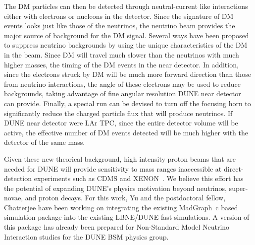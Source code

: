 The DM particles can then be detected through neutral-current like interactions either with electrons or nucleons in the detector. Since the signature of DM events looks just like those of the neutrinos, the neutrino beam provides the major source of background for the DM signal. Several ways have been proposed to suppress neutrino backgrounds by using the unique characteristics of the DM in the beam. Since DM will travel much slower than the neutrinos with much higher masses, the timing of the DM events in the near detector.  In addition, since the electrons struck by DM will be much more forward direction than those from neutrino interactions, the angle of these electrons may be used to reduce backgrounds, taking advantage of fine angular resolution DUNE near detector can provide. Finally, a special run can be devised to turn off the focusing horn to significantly reduce the charged particle flux that will produce neutrinos. If DUNE near detector were LAr TPC, since the entire detector volume will be active, the effective number of DM events detected will be much higher with the detector of the same mass. 

Given these new theorical background, high intensity proton beams that are needed for DUNE will provide sensitivity to mass ranges inaccessible at direct-detection experiments such as CDMS and XENON~\cite{Aprile:2012nq}.  
We believe this effort has the potential of expanding DUNE's physics motivation beyond neutrinos, super-novae, and 
proton decays.  
For this work, Yu and the postdoctoral fellow, Chatterjee have been working on integrating the existing MadGraph~c\cite{if:madDraph} based simulation package into the existing LBNE/DUNE fast simulations.
A version of this package has already been prepared for Non-Standard Model Neutrino Interaction studies for the DUNE BSM physics group.


